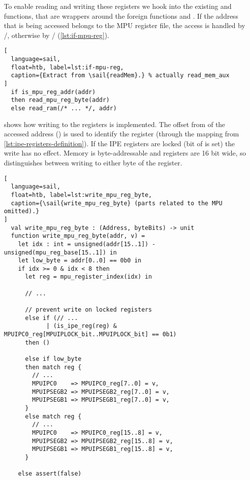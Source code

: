 To enable reading and writing these registers we hook into the existing  and  functions, that are wrappers around the foreign functions  and . If the address that is being accessed belongs to the MPU register file, the access is handled by /, otherwise by / (\cref{lst:if-mpu-reg}).

\begin{lstlisting}[
  language=sail,
  float=htb, label=lst:if-mpu-reg,
  caption={Extract from \sail{readMem}.} % actually read_mem_aux
]
  if is_mpu_reg_addr(addr)
  then read_mpu_reg_byte(addr)
  else read_ram(/* ... */, addr)
\end{lstlisting}

 shows how writing to the registers is implemented. The offset from  of the accessed address () is used to identify the register (through the  mapping from \cref{lst:ipe-registers-definition}). If the IPE registers are locked (\ie bit  of  is set) the write has no effect. Memory is byte-addressable and registers are 16 bit wide, so  distinguishes between writing to either byte of the register.

\begin{lstlisting}[
  language=sail,
  float=htb, label=lst:write_mpu_reg_byte,
  caption={\sail{write_mpu_reg_byte} (parts related to the MPU omitted).}
]
  val write_mpu_reg_byte : (Address, byteBits) -> unit
  function write_mpu_reg_byte(addr, v) =
    let idx : int = unsigned(addr[15..1]) - unsigned(mpu_reg_base[15..1]) in
    let low_byte = addr[0..0] == 0b0 in
    if idx >= 0 & idx < 8 then
      let reg = mpu_register_index(idx) in

      // ...

      // prevent write on locked registers
      else if (// ...
            | (is_ipe_reg(reg) & MPUIPC0_reg[MPUIPLOCK_bit..MPUIPLOCK_bit] == 0b1)
      then ()

      else if low_byte
      then match reg {
        // ...
        MPUIPC0    => MPUIPC0_reg[7..0] = v,
        MPUIPSEGB2 => MPUIPSEGB2_reg[7..0] = v,
        MPUIPSEGB1 => MPUIPSEGB1_reg[7..0] = v,
      }
      else match reg {
        // ...
        MPUIPC0    => MPUIPC0_reg[15..8] = v,
        MPUIPSEGB2 => MPUIPSEGB2_reg[15..8] = v,
        MPUIPSEGB1 => MPUIPSEGB1_reg[15..8] = v,
      }

    else assert(false)
\end{lstlisting}

